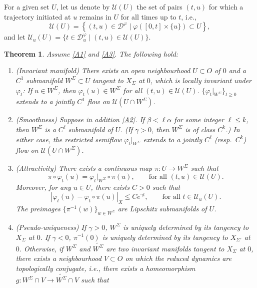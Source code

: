 \documentclass[a4paper, 12pt, oneside, reqno, notitlepage]{amsart}
\theoremstyle{plain}
\newtheorem{theorem}{Theorem}
\theoremstyle{definition}
\theoremstyle{remark}
\begin{document}
For a given set $U$, let us denote by $\mathcal{U}(U)$ the set of pairs $(t,u)$ for which a trajectory initiated at $u$ remains in $U$ for all times up to $t$, i.e.,
\begin{displaymath}
    \mathcal{U}(U) = \left\{ (t,u) \in \mathcal{D}^\varphi  \; \big| \; \varphi ([0,t] \times \{u\}) \subset U  \right\},
\end{displaymath}
and let $\mathcal{U}_u(U) = \{ t \in \mathcal{D}^\varphi_u \; | \; (t,u) \in \mathcal{U}(U) \}$.

\begin{theorem} \label{thm:main1}
    Assume \ref{A1} and \ref{A3}.
    The following hold:
    \begin{enumerate}[label=\upshape{(\roman*)}]
        \item \label{thm1st1} \textup{(Invariant manifold)} There exists an open neighbourhood $U \subset O$ of $0$ and a $C^1$ submanifold $W^\Sigma \subset U$ tangent to $X_\Sigma$ at $0$, which is locally invariant under $\varphi_t$: If $u \in W^\Sigma$, then $\varphi_t(u) \in W^\Sigma$ for all $(t,u) \in \mathcal{U}(U)$.
        $\{\varphi_t|_{W^\Sigma} \}_{t \geq 0}$ extends to a jointly $C^1$ flow on $\mathcal{U}(U \cap W^\Sigma)$.
        \item \label{thm1st2} \textup{(Smoothness)}  Suppose in addition \ref{A2}. If $\beta < \ell \alpha $ for some integer $\ell \leq k$, then $W^\Sigma$ is a $C^\ell$ submanifold of $U$. (If $\gamma > 0$, then $W^\Sigma$ is of class $C^k$.)
        In either case, the restricted semiflow $\varphi_t|_{W^\Sigma}$ extends to a jointly $C^\ell$ (resp.\ $C^k$) flow on $\mathcal{U}(U \cap W^\Sigma)$.
        \item \label{thm1st3} \textup{(Attractivity)} There exists a continuous map $\pi : U \to W^\Sigma$ such that 
        \begin{equation}
            \pi \circ \varphi_t(u) = \varphi_t\vert_{W^\Sigma} \circ \pi (u), \qquad \text{for all } (t,u) \in \mathcal{U}(U).
            \label{eq:pi}
        \end{equation}
        Moreover, for any $u \in U$, there exists $C > 0$ such that 
        \begin{equation}
            | \varphi_t(u) - \varphi_t \circ \pi (u)|_X \leq C e^{ \gamma t}, \qquad \text{for all } t \in \mathcal{U}_u(U).
            \label{eq:attractivity}
        \end{equation}
        The preimages $\{\pi^{-1}(w)\}_{w \in W^\Sigma}$ are Lipschitz submanifolds of $U$.
        \item \label{thm1st4} \textup{(Pseudo-uniqueness)} If $\gamma > 0$, $W^\Sigma$ is uniquely determined by its tangency to $X_\Sigma$ at $0$. If $\gamma < 0$, $\pi^{-1}(0)$ is uniquely determined by its tangency to $X_{\Sigma'}$ at $0$. Otherwise, if $W^\Sigma$ and $\widetilde{W^\Sigma}$ are two invariant manifolds tangent to $X_\Sigma$ at $0$, there exists a neighbourhood $V \subset O$ on which the reduced dynamics are topologically conjugate, i.e., there exists a homeomorphism $g : W^\Sigma \cap V \to \widetilde{W^\Sigma} \cap V$ such that

\end{enumerate}
\end{theorem}
\end{document}

